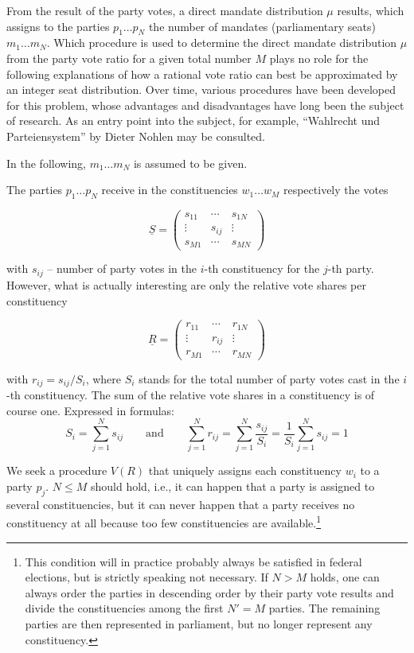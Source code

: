 From the result of the party votes, a direct mandate distribution $\mu$ results, which assigns
to the parties $p_1 \ldots p_N$ the number of mandates (parliamentary seats) $m_1 \ldots m_N$.
Which procedure is used to determine the direct mandate distribution $\mu$ from the party vote ratio for a given total number $M$
plays no role for the following explanations of
how a rational vote ratio can best be approximated by an integer seat distribution.
Over time, various procedures have been developed for this problem, whose advantages and disadvantages have long been the subject of research.
As an entry point into the subject, for example, \enquote{Wahlrecht und Parteiensystem} by Dieter Nohlen may be consulted.

In the following, $m_1 \ldots m_N$ is assumed to be given.

The parties $p_1 \ldots p_N$ receive in the constituencies $w_1 \ldots w_M$ respectively the votes

\[
  \underline{S} = \begin{pmatrix}
    s_{11} & \cdots & s_{1N} \\
    \vdots & s_{ij} & \vdots \\
    s_{M1} & \cdots & s_{MN}
  \end{pmatrix}
\]

with $s_{ij}$ -- number of party votes in the $i$-th constituency for the $j$-th party.
However, what is actually interesting are only the relative vote shares per constituency

\[
  \underline{R} = \begin{pmatrix}
    r_{11} & \cdots & r_{1N} \\
    \vdots & r_{ij} & \vdots \\
    r_{M1} & \cdots & r_{MN}
  \end{pmatrix}
\]

with $r_{ij} = s_{ij}/S_i$, where $S_i$ stands for the total number of party votes cast in the
$i$-th constituency. The sum of the relative vote shares in a constituency is of course
one. Expressed in formulas:
\[
  S_i = \sum_{j=1}^{N} s_{ij}
  \qquad \text{and} \qquad
  \sum_{j=1}^{N} r_{ij} = \sum_{j=1}^{N} \frac{s_{ij}}{S_i}
    = \frac{1}{S_i}\sum_{j=1}^{N} s_{ij} = 1
\]

We seek a procedure $V(R)$ that uniquely assigns each constituency $w_i$ to a party $p_j$.
$N \leq M$ should hold, i.e., it can happen that a party is assigned to several constituencies,
but it can never happen that a party receives no constituency at all
because too few constituencies are available.\footnote{This condition will in practice probably
always be satisfied in federal elections, but is strictly speaking not necessary. If $N > M$
holds, one can always order the parties in descending order by their party vote results and
divide the constituencies among the first $N' = M$ parties. The remaining parties are then
represented in parliament, but no longer represent any constituency.}

